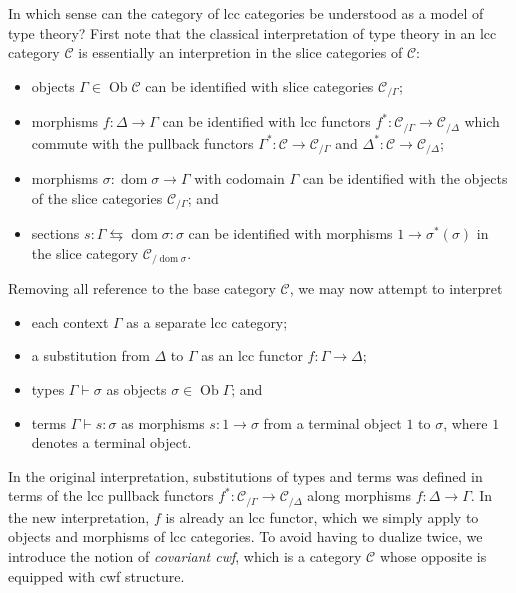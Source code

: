 \documentclass{article}
\begin{document}
In which sense can the category of lcc categories be understood as a model of type theory?
First note that the classical interpretation of type theory in an lcc category $\mathcal{C}$ is essentially an interpretion in the slice categories of $\mathcal{C}$:
\begin{itemize}
  \item
    objects $\Gamma \in \operatorname{Ob} \mathcal{C}$ can be identified with slice categories $\mathcal{C}_{/ \Gamma}$;
  \item
    morphisms $f : \Delta \rightarrow \Gamma$ can be identified with lcc functors $f^* : \mathcal{C}_{/ \Gamma} \rightarrow \mathcal{C}_{/ \Delta}$ which commute with the pullback functors $\Gamma^* : \mathcal{C} \rightarrow \mathcal{C}_{/ \Gamma}$ and $\Delta^* : \mathcal{C} \rightarrow \mathcal{C}_{/ \Delta}$;
  \item
    morphisms $\sigma : \operatorname{dom} \sigma \rightarrow \Gamma$ with codomain $\Gamma$ can be identified with the objects of the slice categories $\mathcal{C}_{/ \Gamma}$; and
  \item
    sections $s : \Gamma \leftrightarrows \operatorname{dom} \sigma : \sigma$ can be identified with morphisms $1 \rightarrow \sigma^*(\sigma)$ in the slice category $\mathcal{C}_{/ \operatorname{dom} \sigma}$.
\end{itemize}
Removing all reference to the base category $\mathcal{C}$, we may now attempt to interpret
\begin{itemize}
  \item
    each context $\Gamma$ as a separate lcc category;
  \item
    a substitution from $\Delta$ to $\Gamma$ as an lcc functor $f : \Gamma \rightarrow \Delta$;
  \item
    types $\Gamma \vdash \sigma$ as objects $\sigma \in \operatorname{Ob} \Gamma$; and
  \item
    terms $\Gamma \vdash s : \sigma$ as morphisms $s : 1 \rightarrow \sigma$ from a terminal object $1$ to $\sigma$, where $1$ denotes a terminal object.
\end{itemize}
In the original interpretation, substitutions of types and terms was defined in terms of the lcc pullback functors $f^* : \mathcal{C}_{/ \Gamma} \rightarrow \mathcal{C}_{/ \Delta}$ along morphisms $f : \Delta \rightarrow \Gamma$.
In the new interpretation, $f$ is already an lcc functor, which we simply apply to objects and morphisms of lcc categories.
To avoid having to dualize twice, we introduce the notion of \emph{covariant cwf}, which is a category $\mathcal{C}$ whose opposite is equipped with cwf structure.
\end{document}

